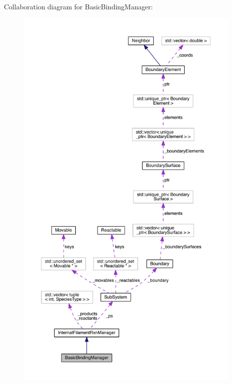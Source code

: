 Collaboration diagram for Basic\+Binding\+Manager\+:
\nopagebreak
\begin{figure}[H]
\begin{center}
\leavevmode
\includegraphics[height=550pt]{classBasicBindingManager__coll__graph}
\end{center}
\end{figure}

